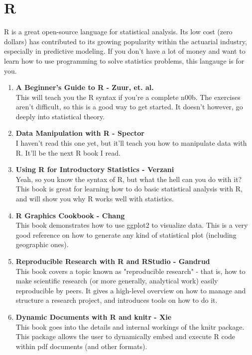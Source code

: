 \documentclass[oneside, titlepage]{article}
\begin{document}
\section{R}
R is a great open-source language for statistical analysis. Its low cost (zero dollars) has contributed to its growing popularity within the actuarial industry, especially in predictive modeling. If you don't have a lot of money and want to learn how to use programming to solve statistics problems, this langauge is for you.

\begin{enumerate}
\item{\bfseries A Beginner's Guide to R - Zuur, et. al.}\\
This will teach you the R syntax if you're a complete n00b. The exercises aren't difficult, so this is a good way to get started. It doesn't however, go deeply into statistical theory.

\item{\bfseries Data Manipulation with R - Spector}\\
I haven't read this one yet, but it'll teach you how to manipulate data with R. It'll be the next R book I read.

\item{\bfseries Using R for Introductory Statistics - Verzani}\\
Yeah, so you know the syntax of R, but what the hell can you do with it? This book is great for learning how to do basic statistical analysis with R, and will show you why R works well with statistics.

\item{\bfseries R Graphics Cookbook - Chang}\\
This book demonstrates how to use ggplot2 to visualize data. This is a very good reference on how to generate any kind of statistical plot (including geographic ones).

\item{\bfseries Reproducible Research with R and RStudio - Gandrud}\\
This book covers a topic known as "reproducible research" - that is, how to make scientific research (or more generally, analytical work) easily reproducible by peers. It gives a high-level overview on how to manage and structure a research project, and introduces tools on how to do it.

\item{\bfseries Dynamic Documents with R and knitr - Xie}\\
This book goes into the details and internal workings of the knitr package. This package allows the user to dynamically embed and execute R code within pdf documents (and other formats).


\end{enumerate}
\end{document}
